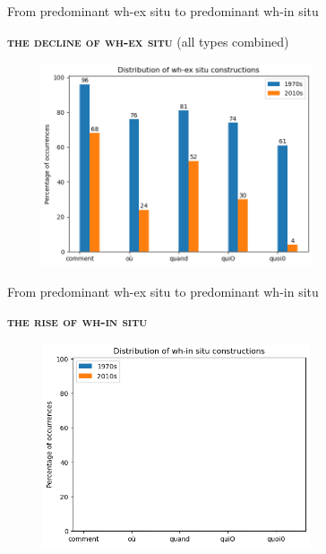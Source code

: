 \documentclass[lesson_slides]{subfiles}
\begin{document}
\begin{frame}[c]{From predominant wh-ex situ to predominant wh-in situ}

    \textbf{\textsc{the decline of wh-ex situ}} (all types combined)
    \begin{center}
        \includegraphics[width=10cm, height=6cm]{images/exsituall.png}
    \end{center}
  
\end{frame}
\begin{frame}[c]{From predominant wh-ex situ to predominant wh-in situ}

    \textbf{\textsc{the rise of wh-in situ}} \pause
    \begin{center}
        \includegraphics[width=10cm, height=6cm]{images/insituempty.png}
    \end{center}
  
\end{frame}
\end{document}
